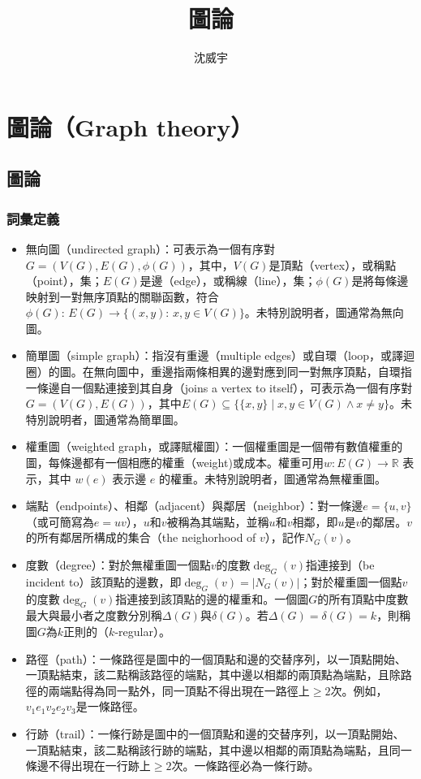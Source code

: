 \documentclass[a4paper,12pt]{report}
\begin{document}
\title{圖論}
\author{沈威宇}
\date{\temtoday}
\titletocdoc
\chapter{圖論（Graph theory）}
\section{圖論}
\subsection{詞彙定義}
\begin{itemize}
\item 無向圖（undirected graph）：可表示為一個有序對$G=(V(G), E(G), \phi(G))$，其中，$V(G)$是頂點（vertex），或稱點（point），集；$E(G)$是邊（edge），或稱線（line），集；$\phi(G)$是將每條邊映射到一對無序頂點的關聯函數，符合$\phi(G): \,E(G)\to\{(x, y):\, x, y\in V(G)\}$。未特別說明者，圖通常為無向圖。
\item 簡單圖（simple graph）：指沒有重邊（multiple edges）或自環（loop，或譯迴圈）的圖。在無向圖中，重邊指兩條相異的邊對應到同一對無序頂點，自環指一條邊自一個點連接到其自身（joins a vertex to itself），可表示為一個有序對$G=(V(G), E(G))$，其中$E(G)\subseteq\{\{x, y\}\mid x, y\in V(G)\wedge x\neq y\}$。未特別說明者，圖通常為簡單圖。
\item 權重圖（weighted graph，或譯賦權圖）：一個權重圖是一個帶有數值權重的圖，每條邊都有一個相應的權重（weight)或成本。權重可用$w: E(G) \rightarrow \mathbb{R}$ 表示，其中 $w(e)$ 表示邊 $e$ 的權重。未特別說明者，圖通常為無權重圖。 
\item 端點（endpoints）、相鄰（adjacent）與鄰居（neighbor）：對一條邊$e=\{u, v\}$（或可簡寫為$e=uv$），$u$和$v$被稱為其端點，並稱$u$和$v$相鄰，即$u$是$v$的鄰居。$v$的所有鄰居所構成的集合（the neighorhood of $v$），記作$N_G(v)$。
\item 度數（degree）：對於無權重圖一個點$v$的度數$\deg_G(v)$指連接到（be incident to）該頂點的邊數，即$\deg_G(v)=|N_G(v)|$；對於權重圖一個點$v$的度數$\deg_G(v)$指連接到該頂點的邊的權重和。一個圖$G$的所有頂點中度數最大與最小者之度數分別稱$\Delta(G)$與$\delta(G)$。若$\Delta(G)=\delta(G)=k$，則稱圖$G$為$k$正則的（$k$-regular）。
\item 路徑（path）：一條路徑是圖中的一個頂點和邊的交替序列，以一頂點開始、一頂點結束，該二點稱該路徑的端點，其中邊以相鄰的兩頂點為端點，且除路徑的兩端點得為同一點外，同一頂點不得出現在一路徑上$\geq 2$次。例如，$v_1e_1v_2e_2v_3$是一條路徑。
\item 行跡（trail）：一條行跡是圖中的一個頂點和邊的交替序列，以一頂點開始、一頂點結束，該二點稱該行跡的端點，其中邊以相鄰的兩頂點為端點，且同一條邊不得出現在一行跡上$\geq 2$次。一條路徑必為一條行跡。

\end{itemize}
\end{document}
